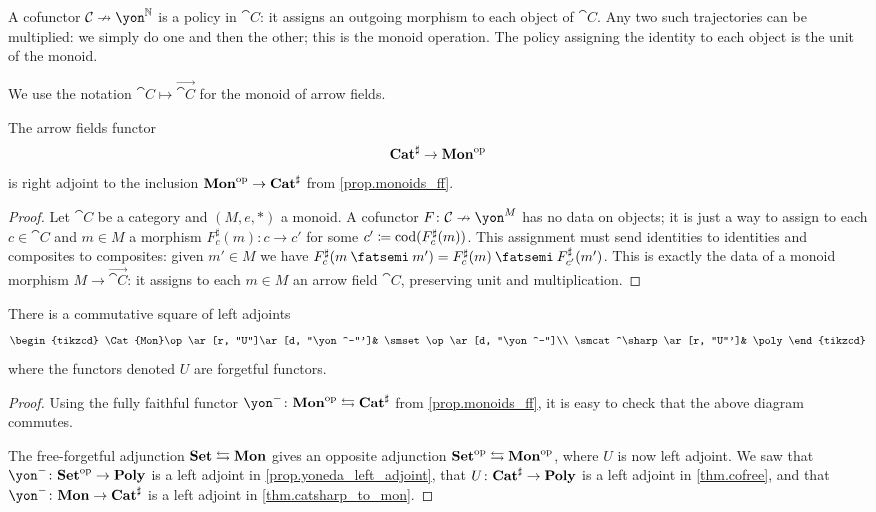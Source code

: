 \documentclass[Book-Poly]{subfiles}
\begin{document}
A cofunctor $\cat{C}\cof\yon^\nn$ is a policy in $\cat{C}$: it assigns an outgoing morphism to each object of $\cat{C}$. Any two such trajectories can be multiplied: we simply do one and then the other; this is the monoid operation. The policy assigning the identity to each object is the unit of the monoid.

We use the notation $\cat{C}\mapsto\vec{\cat{C}}$ for the monoid of arrow fields.

\begin{theorem}\label{thm.catsharp_to_mon}
The arrow fields functor
\[\mathbf{Cat}^\sharp\to\mathbf{Mon}^{\textnormal{op}}\]
is right adjoint to the inclusion $\mathbf{Mon}^{\textnormal{op}}\to\mathbf{Cat}^\sharp$ from \cref{prop.monoids_ff}.
\end{theorem}
\begin{proof}
Let $\cat{C}$ be a category and $(M,e,*)$ a monoid. A cofunctor $F\colon\cat{C}\cof\yon^M$ has no data on objects; it is just a way to assign to each $c\in \cat{C}$ and $m\in M$ a morphism $F^\sharp_c(m)\colon c\to c'$ for some $c'\coloneqq\operatorname{cod}(F^\sharp_c(m))$. This assignment must send identities to identities and composites to composites: given $m'\in M$ we have $F^\sharp_c(m\then m')=F^\sharp_c(m)\then F^\sharp_{c'}(m')$. This is exactly the data of a monoid morphism $M\to \vec{\cat{C}}$: it assigns to each $m\in M$ an arrow field $\cat{C}$, preserving unit and multiplication.
\end{proof}

\begin{proposition}\label{prop.traj_mon_poly}
There is a commutative square of left adjoints
\[
\begin{tikzcd}
	\Cat{Mon}\op\ar[r, "U"]\ar[d, "\yon^-"']&
	\smset\op\ar[d, "\yon^-"]\\
	\smcat^\sharp\ar[r, "U"']&
	\poly
\end{tikzcd}
\]
where the functors denoted $U$ are forgetful functors.
\end{proposition}
\begin{proof}
Using the fully faithful functor $\yon^-\colon\Cat{Mon}\op\fromto\smcat^\sharp$ from \cref{prop.monoids_ff}, it is easy to check that the above diagram commutes. 

The free-forgetful adjunction $\mathbf{Set}\leftrightarrows\mathbf{Mon}$ gives an opposite adjunction $\mathbf{Set}^{\textnormal{op}}\leftrightarrows\mathbf{Mon}^{\textnormal{op}}$, where $U$ is now left adjoint. We saw that $\yon^-\colon\smset\op\to\poly$ is a left adjoint in \cref{prop.yoneda_left_adjoint}, that $U\colon\mathbf{Cat}^\sharp\to\mathbf{Poly}$ is a left adjoint in \cref{thm.cofree}, and that $\yon^-\colon\Cat{Mon}\to\smcat^\sharp$ is a left adjoint in \cref{thm.catsharp_to_mon}.
\end{proof}
\end{document}
